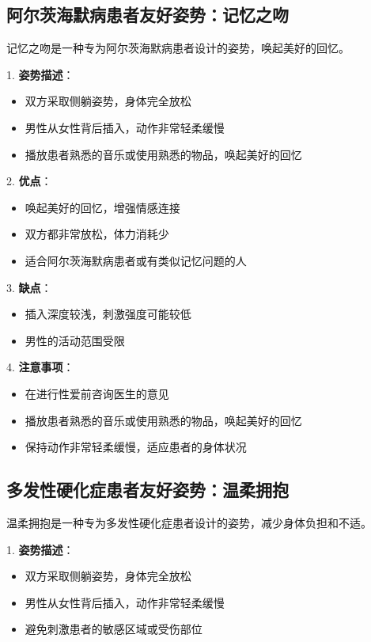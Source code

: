 \documentclass[12pt,UTF8]{ctexbook}
\begin{document}
\subsection{阿尔茨海默病患者友好姿势：记忆之吻}

记忆之吻是一种专为阿尔茨海默病患者设计的姿势，唤起美好的回忆。

1. \textbf{姿势描述}：
  \begin{itemize}
  \item 双方采取侧躺姿势，身体完全放松
  \item 男性从女性背后插入，动作非常轻柔缓慢
  \item 播放患者熟悉的音乐或使用熟悉的物品，唤起美好的回忆
  \end{itemize}

2. \textbf{优点}：
  \begin{itemize}
  \item 唤起美好的回忆，增强情感连接
  \item 双方都非常放松，体力消耗少
  \item 适合阿尔茨海默病患者或有类似记忆问题的人
  \end{itemize}

3. \textbf{缺点}：
  \begin{itemize}
  \item 插入深度较浅，刺激强度可能较低
  \item 男性的活动范围受限
  \end{itemize}

4. \textbf{注意事项}：
  \begin{itemize}
  \item 在进行性爱前咨询医生的意见
  \item 播放患者熟悉的音乐或使用熟悉的物品，唤起美好的回忆
  \item 保持动作非常轻柔缓慢，适应患者的身体状况
  \end{itemize}

\subsection{多发性硬化症患者友好姿势：温柔拥抱}

温柔拥抱是一种专为多发性硬化症患者设计的姿势，减少身体负担和不适。

1. \textbf{姿势描述}：
  \begin{itemize}
  \item 双方采取侧躺姿势，身体完全放松
  \item 男性从女性背后插入，动作非常轻柔缓慢
  \item 避免刺激患者的敏感区域或受伤部位
  \end{itemize}
\end{document}
